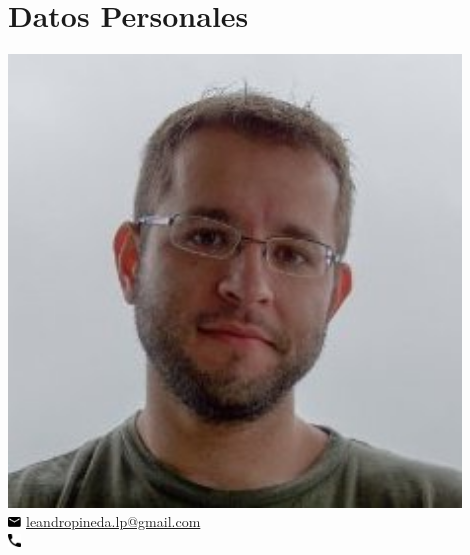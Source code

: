 \documentclass[letterpaper]{deedy-resume} %
\begin{document}

\lastupdated %



\begin{minipage}[t]{0.33\textwidth} %

\section{Datos Personales} 
\includegraphics[width=0.9\textwidth]{photo} \\
\includegraphics[width=10pt,height=8pt]{icons/email.pdf} \href{mailto:leandropineda.lp@gmail.com}{leandropineda.lp@gmail.com} \\
\includegraphics[width=10pt,height=10pt]{icons/phone.pdf} 


\end{minipage}
\end{document}
